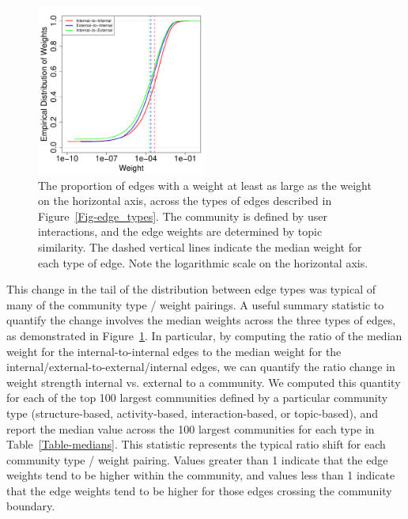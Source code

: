 \begin{figure}[ht]
  \centering
\includegraphics[width=0.50\textwidth]{figures/comm0_labels-mention-retweet_weights-hashtag-ecdf.pdf}
\caption{The proportion of edges with a weight at least as large as the weight on the horizontal axis, across the types of edges described in Figure~\ref{Fig-edge_types}. The community is defined by user interactions, and the edge weights are determined by topic similarity. The dashed vertical lines indicate the median weight for each type of edge. Note the logarithmic scale on the horizontal axis.}
\label{Fig-dist_across_community}
\end{figure}

This change in the tail of the distribution between edge types was typical of many of the community type / weight pairings. A useful summary statistic to quantify the change involves the median weights across the three types of edges, as demonstrated in Figure~\ref{Fig-dist_across_community}. In particular, by computing the ratio of the median weight for the internal-to-internal edges to the median weight for the internal/external-to-external/internal edges, we can quantify the ratio change in weight strength internal vs. external to a community. We computed this quantity for each of the top 100 largest communities defined by a particular community type (structure-based, activity-based, interaction-based, or topic-based), and report the median value across the 100 largest communities for each type in Table~\ref{Table-medians}. This statistic represents the typical ratio shift for each community type / weight pairing. Values greater than 1 indicate that the edge weights tend to be higher within the community, and values less than 1 indicate that the edge weights tend to be higher for those edges crossing the community boundary.


